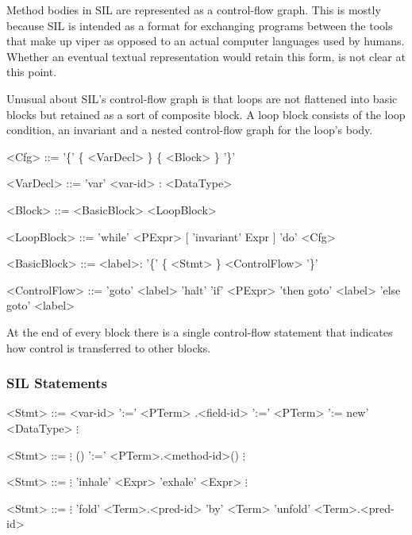 Method bodies in SIL are represented as a control-flow graph. 
This is mostly because SIL is intended as a format for exchanging programs between the tools that make up viper as opposed to an actual computer languages used by humans.
Whether an eventual textual representation would retain this form, is not clear at this point.

Unusual about SIL's control-flow graph is that loops are not flattened into basic blocks but retained as a sort of composite block.
A loop block consists of the loop condition, an invariant and a nested control-flow graph for the loop's body.
\begin{grammar}
<Cfg> ::= '\{' \{ <VarDecl> \} \{ <Block> \} '\}'

<VarDecl> ::= 'var' <var-id> : <DataType>

<Block> ::= <BasicBlock>
	\alt <LoopBlock>

<LoopBlock> ::= 'while' <PExpr> [ 'invariant' Expr ] 'do' <Cfg>

<BasicBlock> ::= <label>: '\{' \{ <Stmt> \} <ControlFlow> '\}'

<ControlFlow> ::= 'goto' <label>
	\alt 'halt'
	\alt 'if' <PExpr> 'then goto' <label> 'else goto' <label>
\end{grammar}

At the end of every block there is a single control-flow statement that indicates how control is transferred to other blocks.

\subsubsection{SIL Statements}

\begin{grammar}
<Stmt> ::= <var-id> ':=' <PTerm>
	\alt <var-id>.<field-id> ':=' <PTerm>
	\alt <var-id> ':= new' <DataType>
	\alt	$\vdots$
\end{grammar}
\begin{grammar}
<Stmt> ::= $\vdots$
	\alt () ':=' <PTerm>.<method-id>()
	\alt $\vdots$
\end{grammar}
\begin{grammar}
<Stmt> ::= $\vdots$
	\alt 'inhale' <Expr>
	\alt 'exhale' <Expr>
	\alt $\vdots$
\end{grammar}
\begin{grammar}
<Stmt> ::= $\vdots$
	\alt 'fold' <Term>.<pred-id> 'by' <Term>
	\alt 'unfold' <Term>.<pred-id>
\end{grammar}


